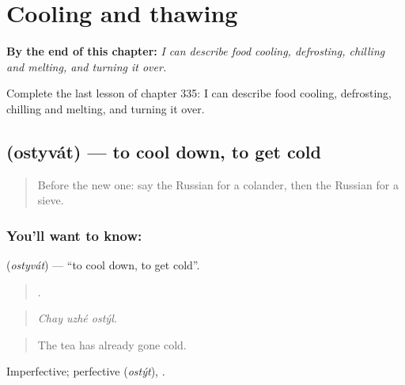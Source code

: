 
\chapter{Cooling and thawing}
\label{ch:ru-cooling-and-thawing}

\begin{chapteropening}
\textbf{By the end of this chapter:} \emph{I can describe food cooling, defrosting, chilling and melting, and turning it over.}

Complete the last lesson of chapter 335: I can describe food cooling, defrosting, chilling and melting, and turning it over.
\end{chapteropening}

\section[\texorpdfstring{\ru{остывать} (ostyvát)}{остывать (ostyvát)}]{ (ostyvát) — to cool down, to get cold}

\label{lesson:RU-C335-ostyvat}



\begin{quote}
Before the new one: say the Russian for a colander, then the Russian for a sieve.
\end{quote}

\subsection*{You'll want to know: }
\textbf{} (\emph{ostyvát}) — \textquotedblleft{}to cool down, to get cold\textquotedblright{}.

\begin{quote}
  .
\end{quote}

\begin{quote}
\emph{Chay uzhé ostýl.}
\end{quote}

\begin{quote}
The tea has already gone cold.
\end{quote}

Imperfective; perfective \emph{} (\emph{ostýt}), \emph{}.

